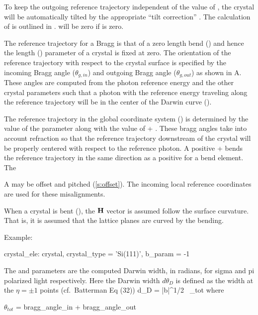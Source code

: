 To keep the outgoing reference trajectory independent of the value of
, the crystal will be automatically tilted by the
appropriate ``tilt correction'' . The calculation of
 is outlined in . 
will be zero if  is zero.

The reference trajectory for a Bragg  is that of a zero
length bend () and hence the length ()
parameter of a crystal is fixed at zero. The orientation of the
reference trajectory with respect to the crystal surface is specified
by the incoming Bragg angle  ($\theta_{g,in}$) and
outgoing Bragg angle  ($\theta_{g,out}$) as shown
in A. These angles are computed from the photon
reference energy and the other crystal parameters such that a photon
with the reference energy traveling along the reference trajectory
will be in the center of the Darwin curve ().

The reference trajectory in the global coordinate system
() is determined by the value of the 
parameter along with the value of  +
. These bragg angles take into account refraction
so that the reference trajectory downstream of the crystal will be
properly centered with respect to the reference photon. A positive
 +  bends the reference
trajectory in the same direction as a positive  for a bend
element. The

A  may be offset and pitched (\ref{s:offset}). The incoming
local reference coordinates are used for these misalignments. 

When a crystal is bent (), the ${\bf H}$ vector is
assumed follow the surface curvature. That is, it is assumed that the
lattice planes are curved by the bending.

Example:
\begin{example}
  crystal_ele: crystal, crystal_type = 'Si(111)', b_param = -1
\end{example}

The  and  parameters are
the computed Darwin width, in radians, for sigma and pi polarized
light respectively. Here the Darwin width $d\theta_D$ is defined as
the width at the $\eta = \pm 1$ points
(cf.~Batterman\cite{b:batterman} Eq (32))
\Begineq
  d\theta_D = 
                 {|b|^{1/2} \, \sin\theta_{tot}}
\Endeq
where
\begin{example}
  \(\theta_{tot}\) = bragg_angle_in + bragg_angle_out 
\end{example}

